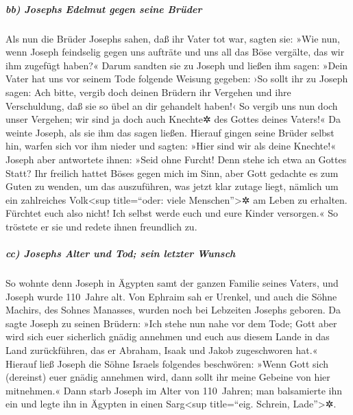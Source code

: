 \hypertarget{bb-josephs-edelmut-gegen-seine-bruxfcder}{%
\subparagraph{bb) Josephs Edelmut gegen seine
Brüder}\label{bb-josephs-edelmut-gegen-seine-bruxfcder}}

 Als nun die Brüder Josephs sahen, daß ihr Vater tot war,
sagten sie: »Wie nun, wenn Joseph feindselig gegen uns aufträte und uns
all das Böse vergälte, das wir ihm zugefügt haben?« 
Darum sandten sie zu Joseph und ließen ihm sagen: »Dein Vater hat uns
vor seinem Tode folgende Weisung gegeben:  ›So sollt ihr
zu Joseph sagen: Ach bitte, vergib doch deinen Brüdern ihr Vergehen und
ihre Verschuldung, daß sie so übel an dir gehandelt haben!‹ So vergib
uns nun doch unser Vergehen; wir sind ja doch auch Knechte✲ des Gottes
deines Vaters!« Da weinte Joseph, als sie ihm das sagen ließen.
 Hierauf gingen seine Brüder selbst hin, warfen sich vor
ihm nieder und sagten: »Hier sind wir als deine Knechte!«
 Joseph aber antwortete ihnen: »Seid ohne Furcht! Denn
stehe ich etwa an Gottes Statt?  Ihr freilich hattet
Böses gegen mich im Sinn, aber Gott gedachte es zum Guten zu wenden, um
das auszuführen, was jetzt klar zutage liegt, nämlich um ein zahlreiches
Volk\textless sup title=``oder: viele Menschen''\textgreater✲ am Leben
zu erhalten.  Fürchtet euch also nicht! Ich selbst werde
euch und eure Kinder versorgen.« So tröstete er sie und redete ihnen
freundlich zu.

\hypertarget{cc-josephs-alter-und-tod-sein-letzter-wunsch}{%
\subparagraph{cc) Josephs Alter und Tod; sein letzter
Wunsch}\label{cc-josephs-alter-und-tod-sein-letzter-wunsch}}

 So wohnte denn Joseph in Ägypten samt der ganzen Familie
seines Vaters, und Joseph wurde 110~Jahre alt.  Von
Ephraim sah er Urenkel, und auch die Söhne Machirs, des Sohnes Manasses,
wurden noch bei Lebzeiten Josephs geboren.  Da sagte
Joseph zu seinen Brüdern: »Ich stehe nun nahe vor dem Tode; Gott aber
wird sich euer sicherlich gnädig annehmen und euch aus diesem Lande in
das Land zurückführen, das er Abraham, Isaak und Jakob zugeschworen
hat.«  Hierauf ließ Joseph die Söhne Israels folgendes
beschwören: »Wenn Gott sich (dereinst) euer gnädig annehmen wird, dann
sollt ihr meine Gebeine von hier mitnehmen.«  Dann starb
Joseph im Alter von 110~Jahren; man balsamierte ihn ein und legte ihn in
Ägypten in einen Sarg\textless sup title=``eig. Schrein,
Lade''\textgreater✲.
